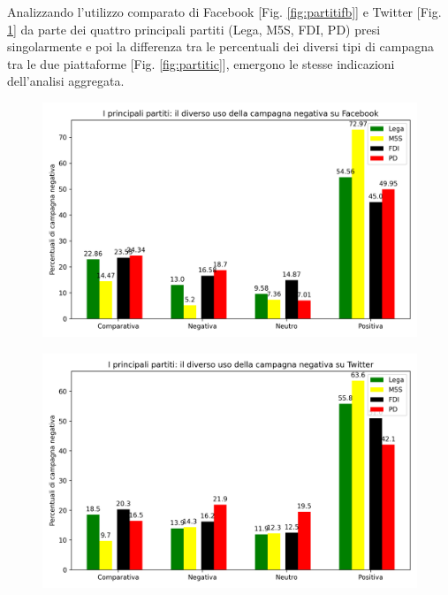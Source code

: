 Analizzando l’utilizzo comparato di Facebook [Fig. \ref{fig:partitifb}] e Twitter [Fig. \ref{fig:partititw}] da parte dei  quattro principali partiti (Lega, M5S, FDI, PD) presi singolarmente e poi la differenza tra le percentuali dei diversi tipi di campagna tra le due piattaforme [Fig. \ref{fig:partitic}], emergono le stesse indicazioni dell’analisi aggregata.\begin{figure}
	\centering
	\begin{minipage}{.5\textwidth}
		\centering
		\includegraphics[width=\linewidth]{figures/partitifb}
		\label{fig:partitifb}
	\end{minipage}%
	\begin{minipage}{.5\textwidth}
		\centering
		\includegraphics[width=\linewidth]{figures/partititw}
		\label{fig:partititw}
	\end{minipage}
\end{figure}
